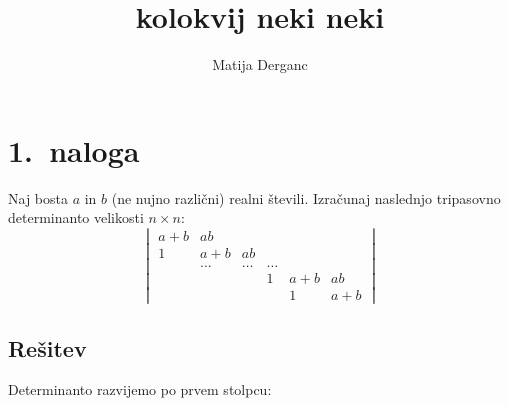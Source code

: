 \documentclass[a4paper,12pt]{article}
\title{kolokvij neki neki}
\author{Matija Derganc}
\begin{document}
\section*{1.~naloga} Naj bosta $a$ in $b$ (ne nujno različni) realni števili. Izračunaj naslednjo tripasovno
determinanto velikosti $n \times n$:
$$
\begin{vmatrix}
    a+b & ab & & & \\
    1 & a+b & ab \\
      & \dots & \dots & \dots \\
     &  &  & 1 & a+b & ab \\
     & & & & 1 & a+b
\end{vmatrix}	$$
\subsection*{Rešitev}
Determinanto razvijemo po prvem stolpcu: 
\end{document}
